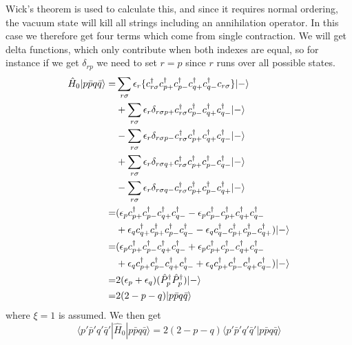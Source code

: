 \documentclass[norsk,a4paper,12pt]{article}
\begin{document}
Wick's theorem is used to calculate this, and since it requires normal ordering, the vacuum state will kill all strings including an annihilation operator. In this case we therefore get four terms which come from single contraction. We will get delta functions, which only contribute when both indexes are equal, so for instance if we get $\delta_{rp}$ we need to set $r=p$ since $r$ runs over all possible states.
\begin{align}
\hat{H}_0|p\bar{p}q\bar{q}\rangle =& \sum_{r\sigma}\epsilon_r\{c_{r\sigma}^{\dagger}c_{p+}^{\dagger}c_{p-}^{\dagger}c_{q+}^{\dagger}c_{q-}^{\dagger}c_{r\sigma}\}|-\rangle\notag\\
&+\sum_{r\sigma}\epsilon_r\delta_{r\sigma p+}c_{r\sigma}^{\dagger}c_{p-}^{\dagger}c_{q+}^{\dagger}c_{q-}^{\dagger}|-\rangle\notag\\
&-\sum_{r\sigma}\epsilon_r\delta_{r\sigma p-}c_{r\sigma}^{\dagger}c_{p+}^{\dagger}c_{q+}^{\dagger}c_{q-}^{\dagger}|-\rangle\notag\\
&+\sum_{r\sigma}\epsilon_r\delta_{r\sigma q+}c_{r\sigma}^{\dagger}c_{p+}^{\dagger}c_{p-}^{\dagger}c_{q-}^{\dagger}|-\rangle\notag\\
&-\sum_{r\sigma}\epsilon_r\delta_{r\sigma q-}c_{r\sigma}^{\dagger}c_{p+}^{\dagger}c_{p-}^{\dagger}c_{q+}^{\dagger}|-\rangle\\
=&(\epsilon_pc_{p+}^{\dagger}c_{p-}^{\dagger}c_{q+}^{\dagger}c_{q-}^{\dagger}-\epsilon_pc_{p-}^{\dagger}c_{p+}^{\dagger}c_{q+}^{\dagger}c_{q-}^{\dagger}\notag\\
&+\epsilon_qc_{q+}^{\dagger}c_{p+}^{\dagger}c_{p-}^{\dagger}c_{q-}^{\dagger}-\epsilon_qc_{q-}^{\dagger}c_{p+}^{\dagger}c_{p-}^{\dagger}c_{q+}^{\dagger})|-\rangle\\
=&(\epsilon_pc_{p+}^{\dagger}c_{p-}^{\dagger}c_{q+}^{\dagger}c_{q-}^{\dagger}+\epsilon_pc_{p+}^{\dagger}c_{p-}^{\dagger}c_{q+}^{\dagger}c_{q-}^{\dagger}\notag\\
&+\epsilon_qc_{p+}^{\dagger}c_{p-}^{\dagger}c_{q+}^{\dagger}c_{q-}^{\dagger}+\epsilon_qc_{p+}^{\dagger}c_{p-}^{\dagger}c_{q+}^{\dagger}c_{q-}^{\dagger})|-\rangle\\
=&2(\epsilon_p+\epsilon_q)(\hat{P}_p^{\dagger}\hat{P}_p^{\dagger})|-\rangle\\
=&2(2-p-q)|p\bar{p}q\bar{q}\rangle
\end{align} 
where $\xi=1$ is assumed. We then get
\begin{equation}
\langle p'\bar{p}'q'\bar{q}'|\hat{H}_0|p\bar{p}q\bar{q}\rangle=2(2-p-q)\langle p'\bar{p}'q'\bar{q}'|p\bar{p}q\bar{q}\rangle
\end{equation}
\end{document}
